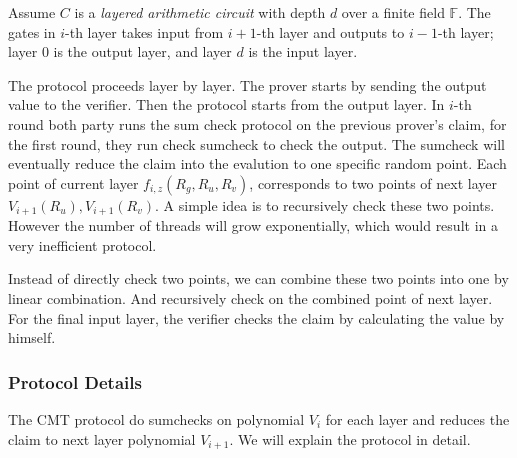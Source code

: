 Assume $C$ is a \textit{layered arithmetic circuit} with depth $d$ over a finite field $\mathbb{F}$. The gates in $i$-th layer takes input from $i+1$-th layer and outputs to $i-1$-th layer; layer $0$ is the output layer, and layer $d$ is the input layer. 

The protocol proceeds layer by layer. The prover starts by sending the output value to the verifier. Then the protocol starts from the output layer. In $i$-th round both party runs the sum check protocol on the previous prover's claim, for the first round, they run check sumcheck to check the output. The sumcheck will eventually reduce the claim into the evalution to one specific random point. Each point of current layer $f_{i,z}(R_g,R_u,R_v)$, corresponds to two points of next layer $V_{i+1}(R_u), V_{i+1}(R_v)$. A simple idea is to recursively check these two points. However the number of threads will grow exponentially, which would result in a very inefficient protocol.

Instead of directly check two points, we can combine these two points into one by linear combination. And recursively check on the combined point of next layer. For the final input layer, the verifier checks the claim by calculating the value by himself.

\subsubsection{Protocol Details}

The CMT protocol do sumchecks on polynomial $V_{i}$ for each layer and reduces the claim to next layer polynomial $V_{i+1}$. We will explain the protocol in detail.

